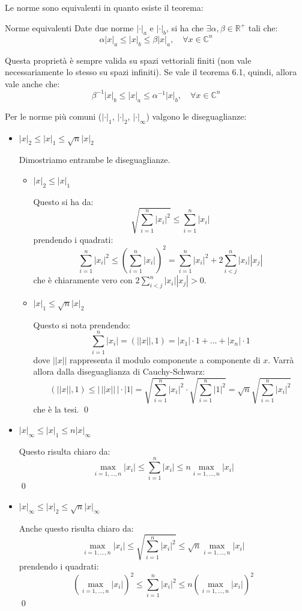 \documentclass[a4paper,11pt]{article}
\begin{document}
Le norme sono equivalenti in quanto esiste il teorema:
\begin{theorem}{Norme equivalenti}
	Date due norme $|\cdot|_a$ e $|\cdot|_b$, si ha che $\exists \alpha, \beta \in \mathbb{R}^+$ tali che:
	$$
		\alpha |x|_a \leq |x|_b \leq \beta |x|_a, \quad \forall x \in \mathbb{C}^n
	$$
\end{theorem}

Questa proprietà è sempre valida su spazi vettoriali finiti (non vale necessariamente lo stesso su spazi infiniti).
Se vale il teorema 6.1, quindi, allora vale anche che:
$$
\beta^{-1} |x|_b \leq |x|_a \leq \alpha^{-1} |x|_b, \quad \forall x \in \mathbb{C}^n
$$

Per le norme più comuni ($|\cdot|_1$, $|\cdot|_2$, $|\cdot|_\infty$) valgono le diseguaglianze:
\begin{itemize}
	\item $|x|_2 \leq |x|_1 \leq \sqrt{n} |x|_2$ \par\smallskip
		Dimostriamo entrambe le diseguaglianze.
		\begin{itemize}
			\item $|x|_2 \leq |x|_1$ \par\smallskip 
				Questo si ha da:
				$$
				\sqrt{\sum_{i = 1}^n |x_i|^2} \leq \sum_{i=1}^n |x_i|
				$$
				prendendo i quadrati:
				$$
				\sum_{i = 1}^n |x_i|^2 \leq \left( \sum_{i=1}^n |x_i| \right)^2 = \sum_{i = 1}^n |x_i|^2 + 2\sum_{i < j}^n |x_i||x_j|
				$$
				che è chiaramente vero con $2\sum_{i < j}^n |x_i||x_j| > 0$.
			\item $|x|_1 \leq \sqrt{n} |x|_2$ \par\smallskip 
				Questo si nota prendendo:
				$$
					\sum_{i = 1}^n |x_i| = (||x||, 1) = |x_1| \cdot 1 + ... + |x_n| \cdot 1
				$$
				dove $||x||$ rappresenta il modulo componente a componente di $x$.
				Varrà allora dalla diseguaglianza di Cauchy-Schwarz:
				$$
				(||x||, 1) \leq | \, ||x|| \, | \cdot |1| = \sqrt{ \sum_{i = 1}^n |x_i|^2 } \cdot \sqrt{ \sum_{i = 1}^n  |1|^2 } = \sqrt{n} \sqrt{ \sum_{i = 1}^n |x_i|^2 }
				$$
				che è la tesi. \qed
		\end{itemize}
	\item $|x|_\infty \leq |x|_1 \leq n |x|_\infty$ \par\smallskip
		Questo risulta chiaro da:
		$$
			\max_{i = 1, ..., n} |x_i| \leq \sum_{i = 1}^n |x_i| \leq n \max_{i = 1, ..., n} |x_i|
		$$ \qed
	\item $|x|_\infty \leq |x|_2 \leq \sqrt{n} |x|_\infty$ \par\smallskip
		Anche questo risulta chiaro da:
		$$
			\max_{i = 1, ..., n} |x_i| \leq \sqrt{ \sum_{i = 1}^n |x_i|^2 } \leq \sqrt{n} \max_{i = 1, ..., n} |x_i|
		$$
		prendendo i quadrati:
		$$
			\left( \max_{i = 1, ..., n} |x_i| \right)^2 \leq \sum_{i = 1}^n |x_i|^2 \leq n \left( \max_{i = 1, ..., n} |x_i| \right)^2
		$$ \qed
\end{itemize}
\end{document}
